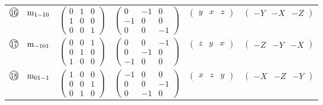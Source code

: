 \documentclass[fleqn,10pt,landscape]{jsarticle}
\begin{document}
\begin{center}
\begin{longtable}{lcccc}
$ {\ooalign{\hfil\resizebox{.8\width}{\height}{16}\hfil\crcr\raise.1ex\hbox{\large$\bigcirc$}}}\quad {\rm m}_{1-10} $ & $ \begin{pmatrix} 0 & 1 & 0 \\ 1 & 0 & 0 \\ 0 & 0 & 1 \end{pmatrix} $ & $ \begin{pmatrix} 0 & -1 & 0 \\ -1 & 0 & 0 \\ 0 & 0 & -1 \end{pmatrix} $ & $ \begin{pmatrix} y & x & z \end{pmatrix} $ & $ \begin{pmatrix} - Y & - X & - Z \end{pmatrix} $ \\
$ {\ooalign{\hfil\resizebox{.8\width}{\height}{17}\hfil\crcr\raise.1ex\hbox{\large$\bigcirc$}}}\quad {\rm m}_{-101} $ & $ \begin{pmatrix} 0 & 0 & 1 \\ 0 & 1 & 0 \\ 1 & 0 & 0 \end{pmatrix} $ & $ \begin{pmatrix} 0 & 0 & -1 \\ 0 & -1 & 0 \\ -1 & 0 & 0 \end{pmatrix} $ & $ \begin{pmatrix} z & y & x \end{pmatrix} $ & $ \begin{pmatrix} - Z & - Y & - X \end{pmatrix} $ \\
$ {\ooalign{\hfil\resizebox{.8\width}{\height}{18}\hfil\crcr\raise.1ex\hbox{\large$\bigcirc$}}}\quad {\rm m}_{01-1} $ & $ \begin{pmatrix} 1 & 0 & 0 \\ 0 & 0 & 1 \\ 0 & 1 & 0 \end{pmatrix} $ & $ \begin{pmatrix} -1 & 0 & 0 \\ 0 & 0 & -1 \\ 0 & -1 & 0 \end{pmatrix} $ & $ \begin{pmatrix} x & z & y \end{pmatrix} $ & $ \begin{pmatrix} - X & - Z & - Y \end{pmatrix} $ \\

\end{longtable}
\end{center}
\end{document}
